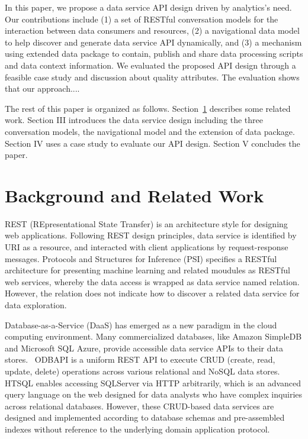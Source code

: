 \documentclass[10pt, conference, compsocconf]{IEEEtran}
\begin{document}
In this paper, we propose a data service API design driven by analytics's need. Our contributions include (1) a set of RESTful conversation models for the interaction between data consumers and resources, (2) a navigational data model to help discover and  generate data service API dynamically, and (3) a mechanism using extended data package to contain, publish and share data processing scripts and data context information. We evaluated the proposed API design through a feasible case study and discussion about quality attributes. The evaluation shows that our approach....

The rest of this paper is organized as follows. Section~\ref{background} describes some related work. Section III introduces the data service design including the three conversation models, the navigational model and the extension of data package. Section IV uses a case study to evaluate our API design. Section V concludes the paper.

\section{Background and Related Work}
\label{background}
REST (REpresentational State Transfer) \cite{fielding2000architectural} is an architecture style for designing web applications. Following REST design principles, data service is identified by URI as a resource, and interacted with client applications by request-response messages. Protocols and Structures for Inference (PSI)\cite{PSI} specifies a RESTful architecture for presenting machine learning and related moudules as RESTful web services, whereby the data access is wrapped as data service named relation. However, the relation does not indicate how to discover a related data service for data exploration.

Database-as-a-Service (DaaS) has emerged as a new paradigm in the cloud computing environment. Many commercialized databases, like Amazon SimpleDB\cite{Amazon} and Microsoft SQL Azure\cite{Azure}, provide accessible data service APIs to their data stores.  ODBAPI\cite{sellami2014odbapi} is a uniform REST API to execute CRUD (create, read, update, delete) operations across various relational and NoSQL data stores. HTSQL\cite{HTSQL} enables accessing SQLServer via HTTP arbitrarily, which is an advanced query language on the web designed for data analysts who have complex inquiries across relational databases. However, these CRUD-based data services are designed and implemented according to database schemas and pre-assembled indexes without reference to the underlying domain application protocol.
\end{document}
